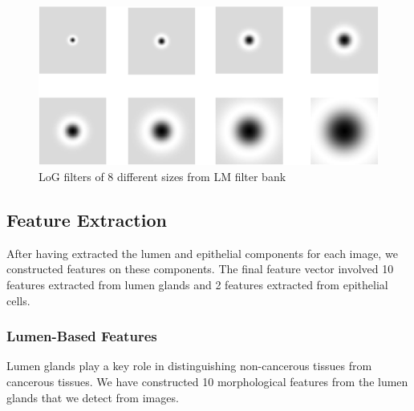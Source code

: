 \begin{figure}[!htb]
\includegraphics[width=\linewidth]{figs/lmf.png}
\caption{LoG filters of 8 different sizes from LM filter bank}
\label{fig:log_filters8}
\end{figure}



\subsection{Feature Extraction}
After having extracted the lumen and epithelial components for each image, we constructed features on these components. The final feature vector involved 10 features extracted from lumen glands and 2 features extracted from epithelial cells.

\subsubsection{Lumen-Based Features}
Lumen glands play a key role in distinguishing non-cancerous tissues from cancerous tissues. We have constructed 10 morphological features from the lumen glands that we detect from images.

